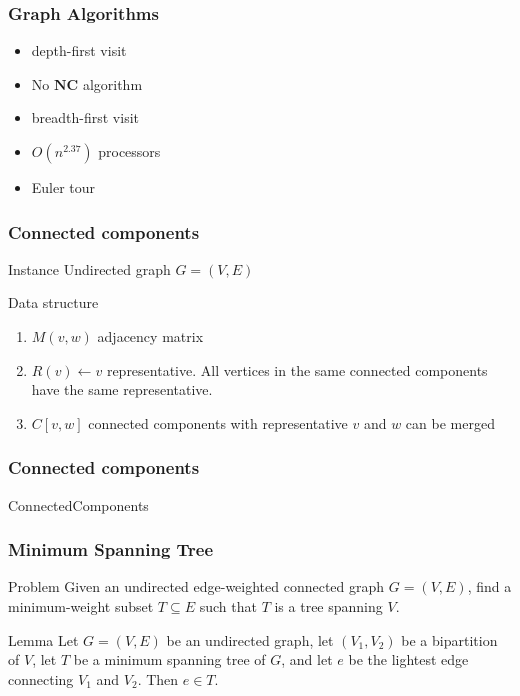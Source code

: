 \documentclass[14pt,aspectratio=169]{beamer}
\begin{document}
\begin{frame}\frametitle{Graph Algorithms}
  \begin{itemize}
  \item
    depth-first visit
  \item
    No $\mathbf{NC}$ algorithm
  \item
    breadth-first visit
  \item
    $O(n^{2.37})$ processors
  \item
    \alert{Euler tour}
  \end{itemize}
\end{frame}


\begin{frame}\frametitle{Connected components}
\begin{block}{Instance}
Undirected graph $G=(V,E)$
\end{block}
\begin{block}{Data structure}
\begin{enumerate} 
\item
$M(v,w)$ adjacency matrix
\item
$R(v) \gets v$ representative.    
All vertices in the same connected components have the same representative.    
\item
$C[v,w]$ connected components with representative $v$ and $w$ can be merged
\end{enumerate}
\end{block}
\end{frame}

\begin{frame}\frametitle{Connected components}
  \begin{algorithm}[H]
    \caption{ConnectedComponents}
  \end{algorithm}
\end{frame}


\begin{frame}\frametitle{Minimum Spanning Tree}
\begin{block}{Problem}
Given an undirected edge-weighted connected graph $G=(V,E)$, find a
minimum-weight subset
$T\subseteq E$ such that $T$ is a tree spanning $V$.    
\end{block}

\begin{block}{Lemma}
Let $G=(V,E)$ be an undirected graph, let $(V_{1}, V_{2})$ be a
bipartition of $V$, let $T$ be a minimum spanning tree of $G$, and let
$e$ be the lightest edge connecting $V_{1}$ and $V_{2}$.    
Then $e\in T$.    
\end{block}
\end{frame}
\end{document}
